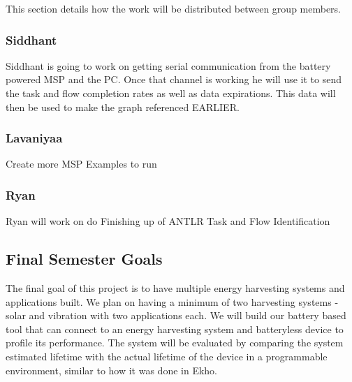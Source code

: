 This section details how the work will be distributed between group members.

\subsubsection{Siddhant}
Siddhant is going to work on getting serial communication from the battery powered MSP and the PC.
Once that channel is working he will use it to send the task and flow completion rates as well as data expirations.
This data will then be used to make the graph referenced EARLIER.

\subsubsection{Lavaniyaa}
Create more MSP Examples to run
\subsubsection{Ryan}
Ryan will work on do
Finishing up of ANTLR Task and Flow Identification


\subsection{Final Semester Goals}
The final goal of this project is to have multiple energy harvesting systems and applications built.
We plan on having a minimum of two harvesting systems - solar and vibration with two applications each.
We will build our battery based tool that can connect to an energy harvesting system and batteryless device to profile its performance.
The system will be evaluated by comparing the system estimated lifetime with the actual lifetime of the device in a programmable environment, similar to how it was done in Ekho.
